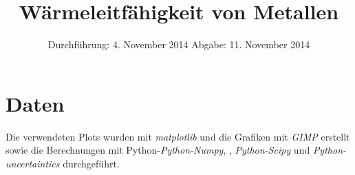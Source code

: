 
\usepackage{longtable}

\subject{Versuch 204}
\title{Wärmeleitfähigkeit von Metallen}

\date{
  Durchführung: 4. November 2014
  \hspace{1em}
  Abgabe: 11. November 2014
}


\maketitle
\thispagestyle{empty}
\newpage





\newpage
\section{Daten}
%
%
%

\nocite{V204}
\printbibliography
\noindent Die verwendeten Plots wurden mit \textit{matplotlib}\cite{matplotlib} und die Grafiken mit \textit{GIMP}\cite{gimp} erstellt sowie die Berechnungen mit Python-\textit{Python-Numpy}, \cite{numpy}, \textit{Python-Scipy}\cite{scipy} und \textit{Python-uncertainties}\cite{uncertainties} durchgeführt.




